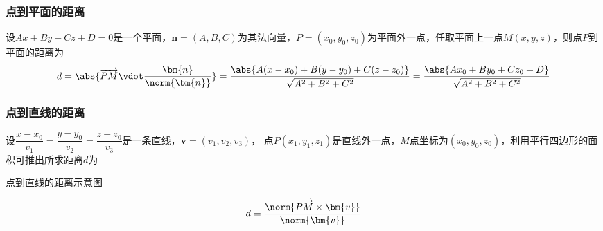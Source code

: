 \subsubsection{点到平面的距离}
设$Ax+By+Cz+D=0$是一个平面，$\bm{n}=(A,B,C)$为其法向量，$P=(x_0,y_0,z_0)$为平面外一点，任取平面上一点$M(x,y,z)$，则点$P$到平面的距离为
\begin{equation}
    \label{eq:点到平面的距离公式}
    d = \abs{\overrightarrow{PM}\vdot\frac{\bm{n}}{\norm{\bm{n}}}}
    = \frac{\abs{A(x-x_0) + B(y-y_0) + C(z-z_0)}}{\sqrt{A^2+B^2+C^2}}
    = \frac{\abs{Ax_0+By_0+Cz_0+D}}{\sqrt{A^2+B^2+C^2}}
\end{equation}

\subsubsection{点到直线的距离}
设$\dfrac{x-x_0}{v_1} = \dfrac{y-y_0}{v_2} = \dfrac{z-z_0}{v_3}$是一条直线，$\bm{v}=(v_1,v_2,v_3)$，
点$P(x_1,y_1,z_1)$是直线外一点，$M$点坐标为$(x_0,y_0,z_0)$，利用平行四边形的面积可推出所求距离$d$为
\begin{marginfigure}
    \centering
    \caption{点到直线的距离示意图}
\end{marginfigure}
\begin{equation}
    \label{eq:点到直线的距离公式}
    d = \frac{\norm{\overrightarrow{PM}\times\bm{v}}}{\norm{\bm{v}}}
\end{equation}

